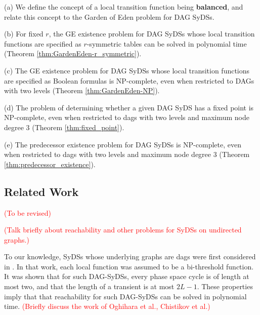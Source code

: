 \begin{description}
\item{(a)} We define the concept of a local transition function being {\bf balanced},
and relate this concept to the Garden of Eden problem for DAG SyDSs.

\item{(b)} For fixed $r$, the GE existence problem for DAG SyDSs
whose local transition functions are specified as $r$-symmetric tables
can be solved in polynomial time
(Theorem \ref{thm:GardenEden-r_symmetric}).

\item{(c)} The GE existence problem for DAG SyDSs
whose local transition functions are specified as Boolean formulas
is NP-complete,
even when restricted to DAGs with two levels
(Theorem \ref{thm:GardenEden-NP}).

\item{(d)} The problem of determining whether a given DAG SyDS 
has a fixed point is NP-complete,
even when restricted to dags with two levels and maximum node degree 3
(Theorem \ref{thm:fixed_point}).

\item{(e)} The predecessor existence problem for DAG SyDSs  is NP-complete,
even when restricted to dags with two levels and maximum node degree 3
(Theorem \ref{thm:predecessor_existence}).
\end{description}
\fi

\subsection{Related Work}
\label{sse:related}

\textcolor{red}{(To be revised)}

\textcolor{red}{(Talk briefly about reachability and other problems
for SyDSs on undirected graphs.)}

To our knowledge, SyDSs whose underlying graphs are dags
were first considered in \cite{KKM+2013}. 
In that work, each local function was assumed to be
a bi-threshold function.
It was shown that for such DAG-SyDSs,
every phase space cycle is of length at most two, 
and that the length of a transient is at most $2L-1$.
These properties imply that that reachability for such DAG-SyDSs
can be solved in polynomial time.
\textcolor{red}{(Briefly discuss the work of Oghihara et al., 
Chistikov et al.)}


